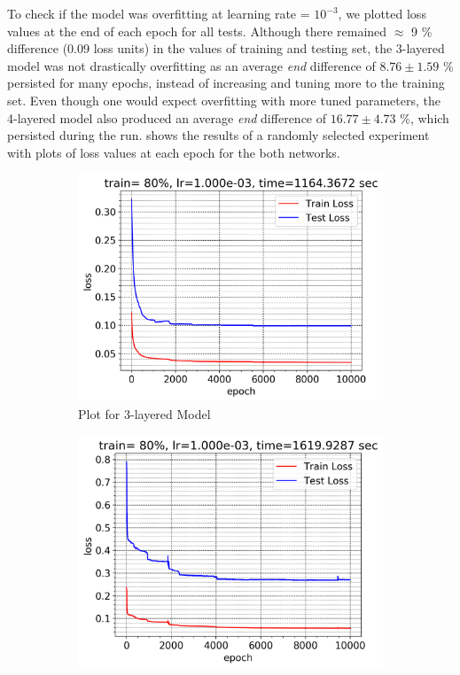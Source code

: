 \documentclass[12pt]{article}
\begin{document}
    To check if the model was overfitting at learning rate = $10^{-3}$, we plotted loss values at the end of each epoch for all tests. Although there remained $\approx$ 9 \% difference (0.09 loss units) in the values of training and testing set, the 3-layered model was not drastically overfitting as an average \textit{end} difference of $8.76 \pm 1.59$ \% persisted for many epochs, instead of increasing and tuning more to the training set. Even though one would expect overfitting with more tuned parameters, the 4-layered model also  produced an average \textit{end} difference of $16.77 \pm 4.73$ \%, which persisted during the run.  shows the results of a randomly selected experiment with plots of loss values at each epoch for the both networks.
    \begin{figure}[!htbp]
        \centering
        \begin{subfigure}{.49\textwidth}
            \centering
            \includegraphics[width=\textwidth]{weights_train_test_loss_3_plot}
            \caption{Plot for 3-layered Model}
            \label{fig:Plot for 3-layered Model}
        \end{subfigure}
        \begin{subfigure}{.49\textwidth}
            \centering
            \includegraphics[width=\textwidth]{weights_train_test_loss_4_plot}

\end{subfigure}
\end{figure}
\end{document}
